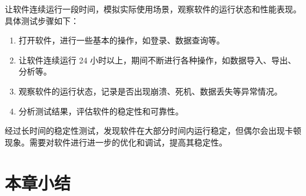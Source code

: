让软件连续运行一段时间，模拟实际使用场景，观察软件的运行状态和性能表现。具体测试步骤如下：
\begin{enumerate}
    \item 打开软件，进行一些基本的操作，如登录、数据查询等。
    \item 让软件连续运行 24 小时以上，期间不断进行各种操作，如数据导入、导出、分析等。
    \item 观察软件的运行状态，记录是否出现崩溃、死机、数据丢失等异常情况。
    \item 分析测试结果，评估软件的稳定性和可靠性。
\end{enumerate}

经过长时间的稳定性测试，发现软件在大部分时间内运行稳定，但偶尔会出现卡顿现象。需要对软件进行进一步的优化和调试，提高其稳定性。

\section{本章小结}